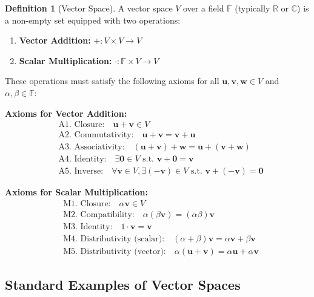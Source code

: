 \documentclass[12pt,a4paper]{article}
\theoremstyle{definition}
\newtheorem{definition}{Definition}[section]
\begin{document}
\begin{definition}[Vector Space]
A vector space $V$ over a field $\mathbb{F}$ (typically $\mathbb{R}$ or $\mathbb{C}$) is a non-empty set equipped with two operations:
\begin{enumerate}
    \item \textbf{Vector Addition:} $+: V \times V \to V$
    \item \textbf{Scalar Multiplication:} $\cdot: \mathbb{F} \times V \to V$
\end{enumerate}

These operations must satisfy the following axioms for all $\mathbf{u}, \mathbf{v}, \mathbf{w} \in V$ and $\alpha, \beta \in \mathbb{F}$:

\textbf{Axioms for Vector Addition:}
\begin{align}
&\text{A1. Closure:} \quad \mathbf{u} + \mathbf{v} \in V \\
&\text{A2. Commutativity:} \quad \mathbf{u} + \mathbf{v} = \mathbf{v} + \mathbf{u} \\
&\text{A3. Associativity:} \quad (\mathbf{u} + \mathbf{v}) + \mathbf{w} = \mathbf{u} + (\mathbf{v} + \mathbf{w}) \\
&\text{A4. Identity:} \quad \exists \mathbf{0} \in V \text{ s.t. } \mathbf{v} + \mathbf{0} = \mathbf{v} \\
&\text{A5. Inverse:} \quad \forall \mathbf{v} \in V, \exists (-\mathbf{v}) \in V \text{ s.t. } \mathbf{v} + (-\mathbf{v}) = \mathbf{0}
\end{align}

\textbf{Axioms for Scalar Multiplication:}
\begin{align}
&\text{M1. Closure:} \quad \alpha \mathbf{v} \in V \\
&\text{M2. Compatibility:} \quad \alpha(\beta \mathbf{v}) = (\alpha\beta)\mathbf{v} \\
&\text{M3. Identity:} \quad 1 \cdot \mathbf{v} = \mathbf{v} \\
&\text{M4. Distributivity (scalar):} \quad (\alpha + \beta)\mathbf{v} = \alpha\mathbf{v} + \beta\mathbf{v} \\
&\text{M5. Distributivity (vector):} \quad \alpha(\mathbf{u} + \mathbf{v}) = \alpha\mathbf{u} + \alpha\mathbf{v}
\end{align}
\end{definition}

\subsection{Standard Examples of Vector Spaces}
\end{document}
